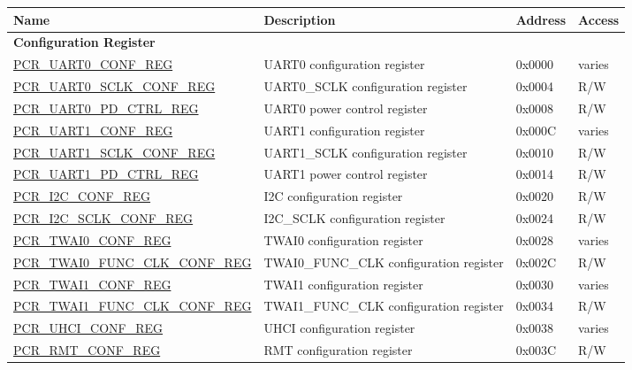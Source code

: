\begin{longtable}{ | p{7cm} | p{6.2cm} | p{1.3cm} | p{1.5cm} | }
\hline\rowcolor{lightgray}
Name & Description &  Address & Access \\ \hline
\endhead
\multicolumn{4}{|l|}{\textbf{Configuration Register}} \\ \hline
\hyperref[regdesc:PCRUART0CONFREG]{PCR\_UART0\_CONF\_REG} & UART0 configuration register & 0x0000 & varies \\ \hline
\hyperref[regdesc:PCRUART0SCLKCONFREG]{PCR\_UART0\_SCLK\_CONF\_REG} & UART0\_SCLK configuration register & 0x0004 & R/W \\ \hline
\hyperref[regdesc:PCRUART0PDCTRLREG]{PCR\_UART0\_PD\_CTRL\_REG} & UART0 power control register & 0x0008 & R/W \\ \hline
\hyperref[regdesc:PCRUART1CONFREG]{PCR\_UART1\_CONF\_REG} & UART1 configuration register & 0x000C & varies \\ \hline
\hyperref[regdesc:PCRUART1SCLKCONFREG]{PCR\_UART1\_SCLK\_CONF\_REG} & UART1\_SCLK configuration register & 0x0010 & R/W \\ \hline
\hyperref[regdesc:PCRUART1PDCTRLREG]{PCR\_UART1\_PD\_CTRL\_REG} & UART1 power control register & 0x0014 & R/W \\ \hline
\hyperref[regdesc:PCRI2CCONFREG]{PCR\_I2C\_CONF\_REG} & I2C configuration register & 0x0020 & R/W \\ \hline
\hyperref[regdesc:PCRI2CSCLKCONFREG]{PCR\_I2C\_SCLK\_CONF\_REG} & I2C\_SCLK configuration register & 0x0024 & R/W \\ \hline
\hyperref[regdesc:PCRTWAI0CONFREG]{PCR\_TWAI0\_CONF\_REG} & TWAI0 configuration register & 0x0028 & varies \\ \hline
\hyperref[regdesc:PCRTWAI0FUNCCLKCONFREG]{PCR\_TWAI0\_FUNC\_CLK\_CONF\_REG} & TWAI0\_FUNC\_CLK configuration register & 0x002C & R/W \\ \hline
\hyperref[regdesc:PCRTWAI1CONFREG]{PCR\_TWAI1\_CONF\_REG} & TWAI1 configuration register & 0x0030 & varies \\ \hline
\hyperref[regdesc:PCRTWAI1FUNCCLKCONFREG]{PCR\_TWAI1\_FUNC\_CLK\_CONF\_REG} & TWAI1\_FUNC\_CLK configuration register & 0x0034 & R/W \\ \hline
\hyperref[regdesc:PCRUHCICONFREG]{PCR\_UHCI\_CONF\_REG} & UHCI configuration register & 0x0038 & varies \\ \hline
\hyperref[regdesc:PCRRMTCONFREG]{PCR\_RMT\_CONF\_REG} & RMT configuration register & 0x003C & R/W \\ \hline

\end{longtable}
